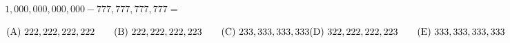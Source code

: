 

$1,000,000,000,000-777,777,777,777=$

$\text{(A)}\ 222,222,222,222 \qquad  \text{(B)}\ 222,222,222,223 \qquad  \text{(C)}\ 233,333,333,333 \qquad \\ \text{(D)}\ 322,222,222,223 \qquad  \text{(E)}\ 333,333,333,333$

